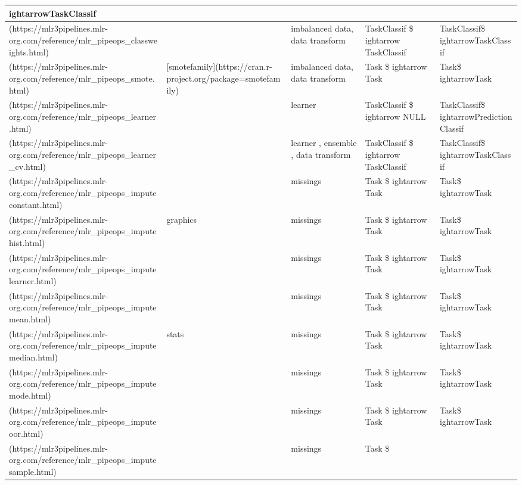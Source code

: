 \documentclass[
]{scrbook}
\begin{document}
\begin{tabular}{l|l|l|l|l}
ightarrowTaskClassif\\
\hline
[`classweights`](https://mlr3pipelines.mlr-org.com/reference/mlr\_pipeops\_classweights.html) &  & imbalanced data, data transform & TaskClassif \$
ightarrow TaskClassif & TaskClassif\$
ightarrowTaskClassif\\
\hline
[`smote`](https://mlr3pipelines.mlr-org.com/reference/mlr\_pipeops\_smote.html) & [smotefamily](https://cran.r-project.org/package=smotefamily) & imbalanced data, data transform & Task \$
ightarrow Task & Task\$
ightarrowTask\\
\hline
[`learner`](https://mlr3pipelines.mlr-org.com/reference/mlr\_pipeops\_learner.html) &  & learner & TaskClassif \$
ightarrow NULL & TaskClassif\$
ightarrowPredictionClassif\\
\hline
[`learner\_cv`](https://mlr3pipelines.mlr-org.com/reference/mlr\_pipeops\_learner\_cv.html) &  & learner       , ensemble      , data transform & TaskClassif \$
ightarrow TaskClassif & TaskClassif\$
ightarrowTaskClassif\\
\hline
[`imputeconstant`](https://mlr3pipelines.mlr-org.com/reference/mlr\_pipeops\_imputeconstant.html) &  & missings & Task \$
ightarrow Task & Task\$
ightarrowTask\\
\hline
[`imputehist`](https://mlr3pipelines.mlr-org.com/reference/mlr\_pipeops\_imputehist.html) & graphics & missings & Task \$
ightarrow Task & Task\$
ightarrowTask\\
\hline
[`imputelearner`](https://mlr3pipelines.mlr-org.com/reference/mlr\_pipeops\_imputelearner.html) &  & missings & Task \$
ightarrow Task & Task\$
ightarrowTask\\
\hline
[`imputemean`](https://mlr3pipelines.mlr-org.com/reference/mlr\_pipeops\_imputemean.html) &  & missings & Task \$
ightarrow Task & Task\$
ightarrowTask\\
\hline
[`imputemedian`](https://mlr3pipelines.mlr-org.com/reference/mlr\_pipeops\_imputemedian.html) & stats & missings & Task \$
ightarrow Task & Task\$
ightarrowTask\\
\hline
[`imputemode`](https://mlr3pipelines.mlr-org.com/reference/mlr\_pipeops\_imputemode.html) &  & missings & Task \$
ightarrow Task & Task\$
ightarrowTask\\
\hline
[`imputeoor`](https://mlr3pipelines.mlr-org.com/reference/mlr\_pipeops\_imputeoor.html) &  & missings & Task \$
ightarrow Task & Task\$
ightarrowTask\\
\hline
[`imputesample`](https://mlr3pipelines.mlr-org.com/reference/mlr\_pipeops\_imputesample.html) &  & missings & Task \$

\end{tabular}
\end{document}
